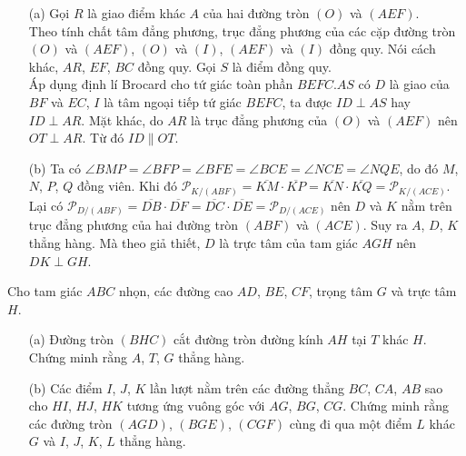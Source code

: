         \begin{solution}
            \hfill
            \begin{enumerate}
                \item[(a)] Gọi \(R\) là giao điểm khác \(A\) của hai đường tròn \((O)\) và \((AEF)\).\\
                Theo tính chất tâm đẳng phương, trục đẳng phương của các cặp đường tròn \((O)\) và \((AEF)\), \((O)\) và \((I)\), \((AEF)\) và \((I)\) đồng quy. Nói cách khác, \(AR\), \(EF\), \(BC\) đồng quy. Gọi \(S\) là điểm đồng quy.\\
                Áp dụng định lí Brocard cho tứ giác toàn phần \(BEFC.AS\) có \(D\) là giao của \(BF\) và \(EC\), \(I\) là tâm ngoại tiếp tứ giác \(BEFC\), ta được \(ID \perp AS\) hay \(ID \perp AR\). Mặt khác, do \(AR\) là trục đẳng phương của \((O)\) và \((AEF)\) nên \(OT \perp AR\). Từ đó \(ID \parallel OT\).
                \item[(b)] Ta có \(\angle BMP = \angle BFP = \angle BFE = \angle BCE = \angle NCE = \angle NQE\), do đó \(M\), \(N\), \(P\), \(Q\) đồng viên. Khi đó \(\mathcal{P}_{K/(ABF)} = \overline{KM} \cdot \overline{KP} = \overline{KN} \cdot \overline{KQ} = \mathcal{P}_{K/(ACE)}\). Lại có \(\mathcal{P}_{D/(ABF)} = \overline{DB} \cdot \overline{DF} = \overline{DC} \cdot \overline{DE} = \mathcal{P}_{D/(ACE)}\) nên \(D\) và \(K\) nằm trên trục đẳng phương của hai đường tròn \((ABF)\) và \((ACE)\). Suy ra \(A\), \(D\), \(K\) thẳng hàng. Mà theo giả thiết, \(D\) là trực tâm của tam giác \(AGH\) nên \(DK \perp GH\).
            \end{enumerate}
        \end{solution}

        \begin{problem}
            Cho tam giác \(ABC\) nhọn, các đường cao \(AD\), \(BE\), \(CF\), trọng tâm \(G\) và trực tâm \(H\).
            \begin{enumerate}
                \item[(a)] Đường tròn \((BHC)\) cắt đường tròn đường kính \(AH\) tại \(T\) khác \(H\). Chứng minh rằng \(A\), \(T\), \(G\) thẳng hàng.
                \item[(b)] Các điểm \(I\), \(J\), \(K\) lần lượt nằm trên các đường thẳng \(BC\), \(CA\), \(AB\) sao cho \(HI\), \(HJ\), \(HK\) tương ứng vuông góc với \(AG\), \(BG\), \(CG\). Chứng minh rằng các đường tròn \((AGD)\), \((BGE)\), \((CGF)\) cùng đi qua một điểm \(L\) khác \(G\) và \(I\), \(J\), \(K\), \(L\) thẳng hàng.
            \end{enumerate}
        \end{problem}

